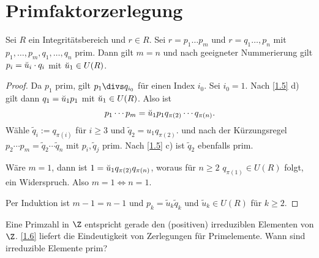 \section{Primfaktorzerlegung}

\begin{st} \label{1.6}
	Sei $R$ ein Integritätsbereich und $r \in R$.
	Sei $r = p_1 \dotsc p_m$ und $r = q_1 \dotsc, p_n$ mit $p_1, \dotsc, p_m, q_1, \dotsc, q_n$ prim.
	Dann gilt $m = n$ und nach geeigneter Nummerierung gilt $p_i = \breve{u}_i \cdot q_i$ mit $\breve{u}_1 \in U(R)$.
	\begin{proof}
		Da $p_1$ prim, gilt $p_1 \divs  q_{i_0}$ für einen Index $i_0$.
		Sei \oBdA $i_0 = 1$.
		Nach \ref{1.5} d) gilt dann $q_1 = \breve{u}_1 p_1$ mit $\breve{u}_1 \in U(R)$.
		Also ist
		\[
			p_1 \dotsb p_m = \breve{u}_1 p_1 q_{\pi(2)} \dotsb q_{\pi(n)}.
		\]
		Wähle $\tilde q_i := q_{\pi(i)}$ für $i \ge 3$ und $\tilde q_2 = u_1 q_{\pi(2)}$.
		und nach der Kürzungsregel $p_2 \dotsb p_m = \tilde q_2 \dotsb \tilde q_n$ mit $p_i, \tilde q_j$ prim.
		Nach \ref{1.5} c) ist $\tilde q_2$ ebenfalls prim.

		Wäre $m = 1$, dann ist $1 = \breve{u}_1 q_{\pi(2)} q_{\pi(n)}$, woraus für $n \ge 2$ $q_{\pi(1)} \in U(R)$ folgt, ein Widerspruch.
		Also $m = 1 \iff n = 1$.

		Per Induktion ist $m - 1 = n - 1$ und $p_k = \tilde u_k \tilde q_k$ und $\tilde u_k \in U(R)$ für $k \ge 2$.
	\end{proof}
\end{st}

Eine Primzahl in $\Z$ entspricht gerade den (positiven) irreduziblen Elementen von $\Z$.
\ref{1.6} liefert die Eindeutigkeit von Zerlegungen für Primelemente.
Wann sind irreduzible Elemente prim?


